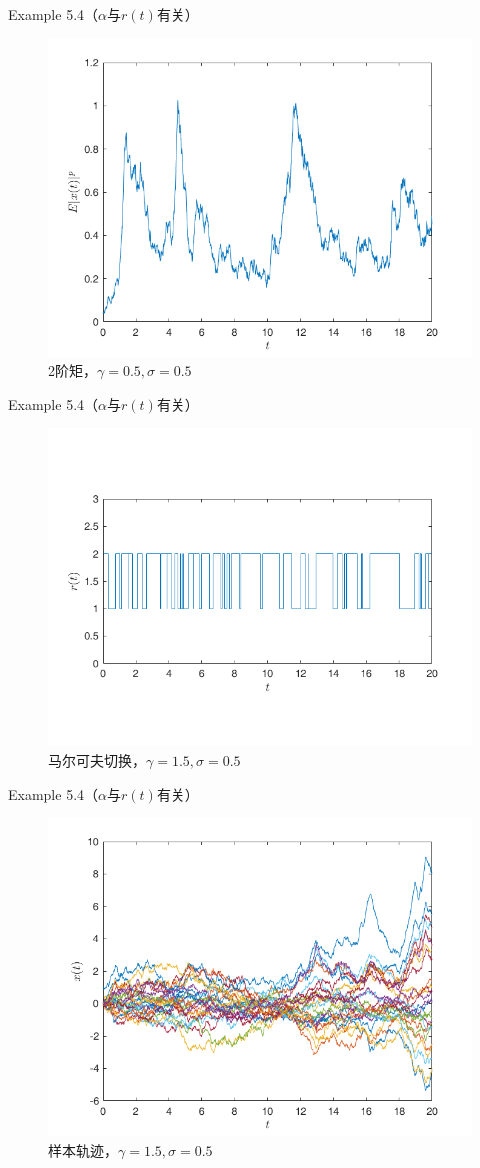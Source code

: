 \documentclass[10pt,aspectratio=43]{beamer}
\begin{document}
\begin{frame}{Example 5.4（$ \alpha $与$ r(t) $有关）
}
\begin{figure}
\centering
\includegraphics[width=0.7\linewidth]{../figures/7}
\caption{2阶矩，$ \gamma=0.5,\sigma=0.5 $}
\end{figure}
\end{frame}

\begin{frame}{Example 5.4（$ \alpha $与$ r(t) $有关）
}
\begin{figure}
\centering
\includegraphics[width=0.7\linewidth]{../figures/8}
\caption{马尔可夫切换，$ \gamma=1.5,\sigma=0.5 $}
\end{figure}
\end{frame}

\begin{frame}{Example 5.4（$ \alpha $与$ r(t) $有关）
}
\begin{figure}
\centering
\includegraphics[width=0.7\linewidth]{../figures/9}
\caption{样本轨迹，$ \gamma=1.5,\sigma=0.5 $}
\end{figure}
\end{frame}
\end{document}
